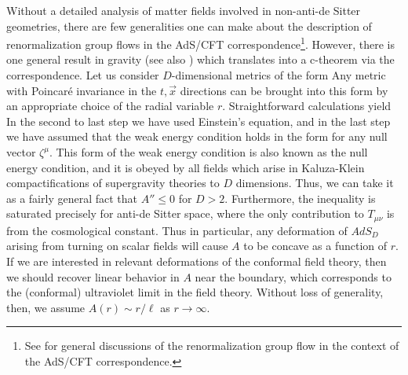 Without a detailed analysis of matter fields involved in non-anti-de Sitter
geometries, there are few generalities one can make about the description
of renormalization group flows in the AdS/CFT correspondence\footnote{See
\cite{Akhmedov:1998vf,Alvarez:1998wr,Gorsky:1998wn,Porrati:1999ew,
Balasubramanian:1999jd}
for general discussions of the renormalization group flow in the context of
the AdS/CFT correspondence.}.  However,
there is one general result in gravity \cite{Freedman:1999gp} (see also
\cite{Girardello:1998pd}) which translates into a c-theorem via the
correspondence.  Let us consider $D$-dimensional metrics of the form
 Any metric with Poincar\'e invariance in the $t,\vec{x}$ directions can be
brought into this form by an appropriate choice of the radial variable $r$.
Straightforward calculations yield
 In the second to last step we have used Einstein's equation, and in the
last step we have assumed that the weak energy condition holds in the form
 for any null vector $\zeta^\mu$.  This form of the weak energy condition
is also known as the null energy condition, and it is obeyed by all fields
which arise in Kaluza-Klein compactifications of supergravity theories to
$D$ dimensions.  Thus, we can take it as a fairly general fact that $A''
\leq 0$ for $D > 2$.  Furthermore, the inequality is saturated precisely
for anti-de Sitter space, where the only contribution to $T_{\mu\nu}$ is
from the cosmological constant.  Thus in particular, any deformation of
$AdS_D$ arising from turning on scalar fields will cause $A$ to be concave
as a function of $r$.  If we are interested in relevant deformations
of the conformal field theory, then we should recover linear behavior in
$A$ near the boundary, which corresponds to the (conformal)
ultraviolet limit in the
field theory.  Without loss of generality, then, we assume $A(r) \sim
r/\ell$ as $r \to \infty$.

